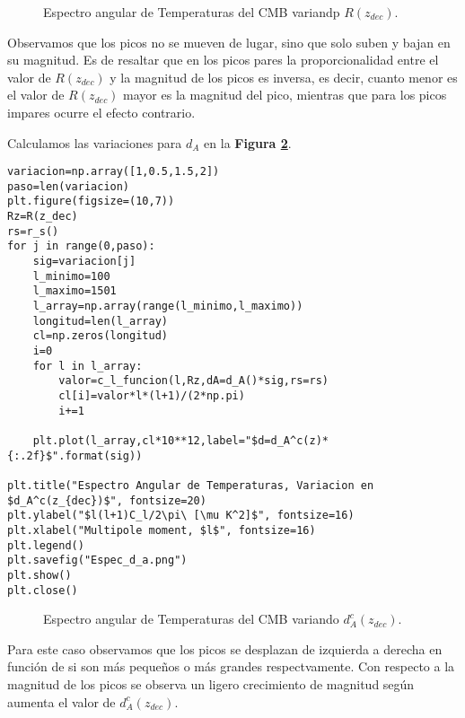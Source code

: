 \documentclass{article}
\begin{document}
\begin{figure}[h]
    \begin{center}
    \end{center}
\caption{\label{fig:2} Espectro angular de Temperaturas del CMB variandp $R(z_{dec})$.}
\end{figure}

Observamos que los picos no se mueven de lugar, sino que solo suben y bajan en su magnitud. Es de resaltar que en los picos pares la proporcionalidad entre el valor de $R(z_{dec})$ y la magnitud de los picos es inversa, es decir, cuanto menor es el valor de $R(z_{dec})$ mayor es la magnitud del pico, mientras que para los picos impares ocurre el efecto contrario.


Calculamos las variaciones para $d_A$ en la \textbf{Figura \ref{fig:3}}.
\begin{lstlisting}[style=Python]
variacion=np.array([1,0.5,1.5,2])
paso=len(variacion)
plt.figure(figsize=(10,7))
Rz=R(z_dec)
rs=r_s()
for j in range(0,paso):
    sig=variacion[j]
    l_minimo=100
    l_maximo=1501
    l_array=np.array(range(l_minimo,l_maximo))
    longitud=len(l_array)
    cl=np.zeros(longitud)
    i=0    
    for l in l_array:
        valor=c_l_funcion(l,Rz,dA=d_A()*sig,rs=rs)
        cl[i]=valor*l*(l+1)/(2*np.pi)
        i+=1
    
    plt.plot(l_array,cl*10**12,label="$d=d_A^c(z)*{:.2f}$".format(sig))

plt.title("Espectro Angular de Temperaturas, Variacion en $d_A^c(z_{dec})$", fontsize=20)
plt.ylabel("$l(l+1)C_l/2\pi\ [\mu K^2]$", fontsize=16)
plt.xlabel("Multipole moment, $l$", fontsize=16)
plt.legend()
plt.savefig("Espec_d_a.png")
plt.show()
plt.close()
\end{lstlisting}

\begin{figure}[h]
    \begin{center}
    \end{center}
\caption{\label{fig:3} Espectro angular de Temperaturas del CMB variando $d_A^c(z_{dec})$.}
\end{figure}

Para este caso observamos que los picos se desplazan de izquierda a derecha en función de si son más pequeños o más grandes respectvamente. Con respecto a la magnitud de los picos se observa un ligero crecimiento de magnitud según aumenta el valor de $d_A^c(z_{dec})$.\\
\end{document}
